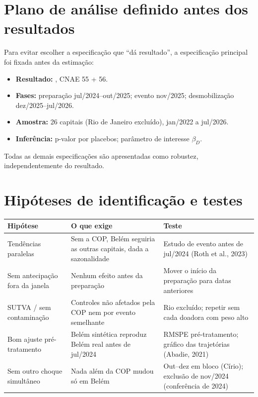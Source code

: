 \section{Plano de análise definido antes dos resultados}

Para evitar escolher a especificação que ``dá resultado'', a especificação principal foi fixada antes da
estimação:
\begin{itemize}
  \item \textbf{Resultado:} , CNAE 55 + 56.
  \item \textbf{Fases:} preparação jul/2024--out/2025; evento nov/2025; desmobilização dez/2025--jul/2026.
  \item \textbf{Amostra:} 26 capitais (Rio de Janeiro excluído), jan/2022 a jul/2026.
  \item \textbf{Inferência:} p-valor por placebos; parâmetro de interesse $\beta_D$.
\end{itemize}
Todas as demais especificações são apresentadas como robustez, independentemente do resultado.


\section{Hipóteses de identificação e testes}

\begin{table}[H]
\centering\small
\begin{tabularx}{\linewidth}{p{3cm}LL}
\toprule
\textbf{Hipótese} & \textbf{O que exige} & \textbf{Teste}\\
\midrule
Tendências paralelas & Sem a COP, Belém seguiria as outras capitais, dada a sazonalidade & Estudo de evento antes de jul/2024 (Roth et al., 2023)\\
Sem antecipação fora da janela & Nenhum efeito antes da preparação & Mover o início da preparação para datas anteriores\\
SUTVA / sem contaminação & Controles não afetados pela COP nem por evento semelhante & Rio excluído; repetir sem cada doadora com peso alto\\
Bom ajuste pré-tratamento & Belém sintética reproduz Belém real antes de jul/2024 & RMSPE pré-tratamento; gráfico das trajetórias (Abadie, 2021)\\
Sem outro choque simultâneo & Nada além da COP mudou só em Belém & Out--dez em bloco (Círio); exclusão de nov/2024 (conferência de 2024)\\
\bottomrule
\end{tabularx}
\end{table}

